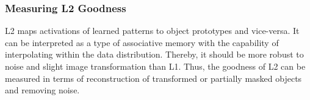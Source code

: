 




\subsubsection{Measuring L2 Goodness}
L2 maps activations of learned patterns to object prototypes and vice-versa.
It can be interpreted as a type of associative memory with the capability of interpolating within the data distribution.
Thereby, it should be more robust to noise and slight image transformation than L1.
Thus, the goodness of L2 can be measured in terms of reconstruction of transformed or partially masked objects and removing noise.


